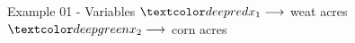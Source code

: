 \begin{frame}{Example 01 - Variables}
\Huge{
$\colora{{x}_{1}} \longrightarrow$
    weat acres \\ \vspace{1cm}
$\colorb{{x}_{2}} \longrightarrow$
    corn acres
}
\end{frame}
